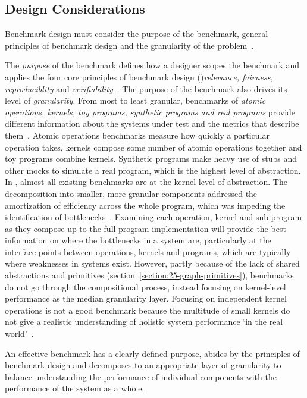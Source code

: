 \subsection{Design Considerations}
Benchmark design must consider the purpose of the benchmark, general principles of benchmark design and the granularity of the problem~\cite{Carpinetti2002}.

The \textit{purpose} of the benchmark defines how a designer scopes the benchmark and applies the four core principles of benchmark design ()\textit{relevance, fairness, reproduciblity} and \textit{verifiability}~\cite{Huppler2009, Kistowski2015}. 
The purpose of the benchmark also drives its level of \textit{granularity}. 
From most to least granular, benchmarks of \textit{atomic operations, kernels, toy programs, synthetic programs and real programs} provide different information about the systems under test and the metrics that describe them~\cite{Hennessy2019}.
Atomic operations benchmarks measure how quickly a particular operation takes, kernels compose some number of atomic operations together and toy programs combine kernels. 
Synthetic programs make heavy use of stubs and other mocks to simulate a real program, which is the highest level of abstraction. 
In \gai, almost all existing benchmarks are at the kernel level of abstraction.
The decomposition into smaller, more granular components addressed the amortization of efficiency across the whole program, which was impeding the identification of bottlenecks~\cite{Saavedra1996}.
Examining each operation, kernel and sub-program as they compose up to the full program implementation will provide the best information on where the bottlenecks in a system are, particularly at the interface points between operations, kernels and programs, which are typically where weaknesses in systems exist. 
However, partly because of the lack of shared abstractions and primitives (section~\ref{section:25-graph-primitives}), benchmarks do not go through the compositional process, instead focusing on kernel-level performance as the median granularity layer.
Focusing on independent kernel operations is not a good benchmark because the multitude of small kernels do not give a realistic understanding of holistic system performance `in the real world'~\cite{Hennessy2019}.

An effective benchmark has a clearly defined purpose, abides by the principles of benchmark design and decomposes to an appropriate layer of granularity to balance understanding the performance of individual components with the performance of the system as a whole. 

